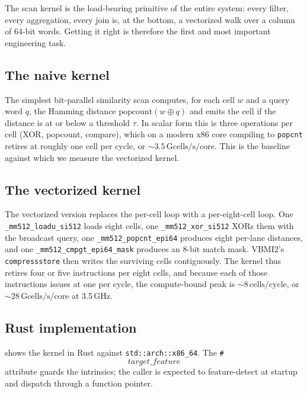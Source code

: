 \documentclass[10pt]{article}
\theoremstyle{definition}
\begin{document}
The scan kernel is the load-bearing primitive of the entire system: every filter, every aggregation, every join is, at the bottom, a vectorized walk over a column of 64-bit words. Getting it right is therefore the first and most important engineering task.

\subsection{The naive kernel}

The simplest bit-parallel similarity scan computes, for each cell $w$ and a query word $q$, the Hamming distance $\mathrm{popcount}(w \oplus q)$ and emits the cell if the distance is at or below a threshold $\tau$. In scalar form this is three operations per cell (XOR, popcount, compare), which on a modern x86 core compiling to \texttt{popcnt} retires at roughly one cell per cycle, or $\sim\!3.5\,\text{Gcells/s/core}$. This is the baseline against which we measure the vectorized kernel.

\subsection{The vectorized kernel}

The vectorized version replaces the per-cell loop with a per-eight-cell loop. One \texttt{\_mm512\_loadu\_si512} loads eight cells, one \texttt{\_mm512\_xor\_si512} XORs them with the broadcast query, one \texttt{\_mm512\_popcnt\_epi64} produces eight per-lane distances, and one \texttt{\_mm512\_cmpgt\_epi64\_mask} produces an 8-bit match mask. VBMI2's \texttt{compressstore} then writes the surviving cells contiguously. The kernel thus retires four or five instructions per eight cells, and because each of those instructions issues at one per cycle, the compute-bound peak is $\sim\!8\,\text{cells/cycle}$, or $\sim\!28\,\text{Gcells/s/core}$ at 3.5\,GHz.

\subsection{Rust implementation}

 shows the kernel in Rust against \texttt{std::arch::x86\_64}. The \texttt{\#\[target\_feature\]} attribute guards the intrinsics; the caller is expected to feature-detect at startup and dispatch through a function pointer.
\end{document}
